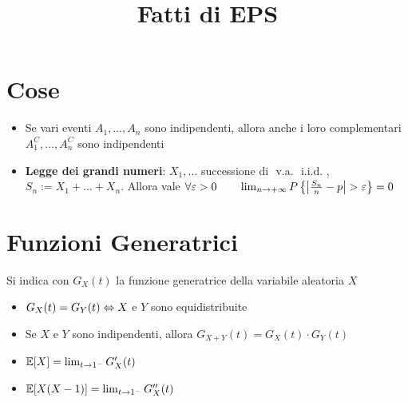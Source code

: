 \documentclass[a4paper, NoNotes, GeneralMath]{stdmdoc}
\newcommand{\E}[1]{\mathbb{E}[{#1}]}
\newcommand{\va}{\mbox{ v.a. }}
\newcommand{\iid}{\mbox{ i.i.d. }}
\begin{document}
	\title{Fatti di EPS}
	\autodate

	\section*{Cose}
	\begin{itemize}
		\item Se vari eventi $A_1, \ldots, A_n$ sono indipendenti, allora anche i loro complementari $A_1^C, \ldots, A_n^C$ sono indipendenti
		\item {\bf Legge dei grandi numeri}: $X_1, \ldots$ successione di $\va \iid$, $S_n := X_1 + \ldots + X_n$. Allora vale $\forall \varepsilon > 0 \qquad \lim_{n\rightarrow +\infty} P\left\{ \left| \frac{S_n}{n} - p \right| > \varepsilon \right\} = 0$
	\end{itemize}

	\section*{Funzioni Generatrici}
	Si indica con $G_X(t)$ la funzione generatrice della variabile aleatoria $X$
	\begin{itemize}
		\item $G_X(t) = G_Y(t) \Leftrightarrow X$ e $Y$ sono equidistribuite
		\item Se $X$ e $Y$ sono indipendenti, allora $G_{X+Y}(t) = G_X(t)\cdot G_Y(t)$
		\item $\E{X} = \lim_{t\rar 1^{-}} G_X'(t)$
		\item $\E{X(X-1)} = \lim_{t\rar 1^{-}} G_X''(t)$
	\end{itemize}
	
\end{document}
